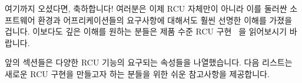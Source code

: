 여기까지 오셨다면, 축하합니다!
여러분은 이제 RCU 자체만이 아니라 이를 둘러싼 소프트웨어 환경과
어프리케이션들의 요구사항에 대해서도 훨씬 선명한 이해를 가졌을 겁니다.
이보다도 깊은 이해를 원하는 분들은 제품 수준 RCU
구현~\cite{MathieuDesnoyers2012URCU,PaulEMcKenney2007PreemptibleRCU,PaulEMcKenney2008HierarchicalRCU,PaulEMcKenney2009BloatwatchRCU}
을 읽어보시기 바랍니다.

앞의 섹션들은 다양한 RCU 기능의 요구되는 속성들을 나열했습니다.
다음 리스트는 새로운 RCU 구현을 만들고자 하는 분들을 위한 쉬운 참고사항을
제공합니다.

\iffalse

If you made it this far, congratulations!
You should now have a much clearer understanding
not only of RCU itself, but also of the requirements of enclosing
software environments and applications.
Those wishing an even deeper understanding are invited to read
descriptions of production-quality RCU
implementations~\cite{MathieuDesnoyers2012URCU,PaulEMcKenney2007PreemptibleRCU,PaulEMcKenney2008HierarchicalRCU,PaulEMcKenney2009BloatwatchRCU}.

The preceding sections listed some desirable properties of the
various RCU primitives.
The following list is provided for easy reference for those wishing to
create a new RCU implementation.

\fi

